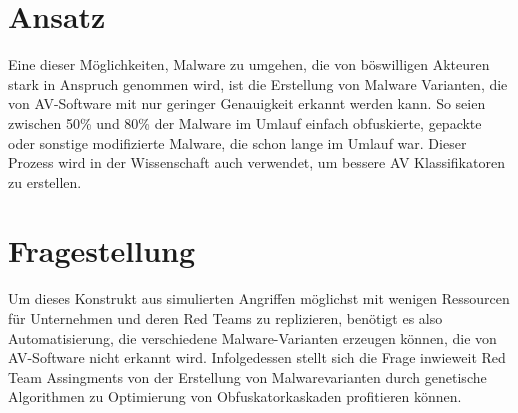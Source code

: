 \section{Ansatz}
Eine dieser Möglichkeiten, Malware zu umgehen, die von böswilligen Akteuren stark in Anspruch genommen wird, ist die Erstellung von Malware Varianten, die von AV-Software mit nur geringer Genauigkeit erkannt werden kann. So seien zwischen 50\%\cite{cesare_2013_malwisean, baterdene_2017_packer} und 80\% \cite{kang_2020_a} der Malware im Umlauf einfach obfuskierte, gepackte oder sonstige modifizierte Malware, die schon lange im Umlauf war. Dieser Prozess wird in der Wissenschaft auch verwendet, um bessere AV Klassifikatoren zu erstellen\cite{murali_2023_evolving}.

\section{Fragestellung}
Um dieses Konstrukt aus simulierten Angriffen möglichst mit wenigen Ressourcen für Unternehmen und deren Red Teams zu replizieren, benötigt es also Automatisierung, die verschiedene Malware-Varianten erzeugen können, die von AV-Software nicht erkannt wird.
Infolgedessen stellt sich die Frage inwieweit Red Team Assingments von der Erstellung von Malwarevarianten durch genetische Algorithmen zu Optimierung von Obfuskatorkaskaden profitieren können.